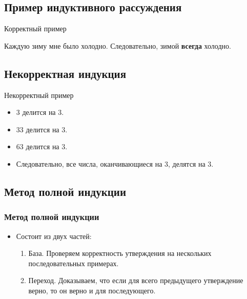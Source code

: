 \documentclass[compress,red]{beamer}
\begin{document}
\subsection{Пример индуктивного рассуждения}
\begin{frame}
  \begin{center}
    \Huge{Корректный пример}
  \end{center}
  \begin{center}
    \Large{Каждую зиму мне было холодно. Следовательно, зимой \textbf{всегда} холодно.}
  \end{center}
\end{frame}

\subsection{Некорректная индукция}
\begin{frame}
  \begin{center}
    \Huge{Некорректный пример}
  \end{center}
  \begin{center}
    \large{
    \begin{itemize}
      \item 3 делится на 3. 
      \item 33 делится на 3. 
      \item 63 делится на 3. 
      \item Следовательно, все числа, оканчивающиеся на 3, делятся на 3.
    \end{itemize}}
  \end{center}
\end{frame}

\subsection{Метод полной индукции}
\begin{frame}[fragile]
  \frametitle{Метод полной индукции}
  \begin{itemize}
    \item Состоит из двух частей:
      \begin{enumerate}
        \item База. Проверяем корректность утверждения на нескольких последовательных примерах.
        \item Переход. Доказываем, что если для всего предыдущего утверждение верно, то он верно и для последующего.
      \end{enumerate}
  \end{itemize}
\end{frame}
\end{document}
